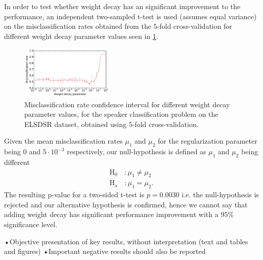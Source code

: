In order to test whether weight decay has an significant improvement to the performance, an independent two-sampled t-test is used (assumes equal variance) on the misclassification rates obtained from the $5$-fold cross-validation for different weight decay parameter values seen in \cref{fig:reg_opt}.

\begin{figure}[H]
  \centering
  \includegraphics[width=0.4\textwidth]{plots/reg_opt_dieleman_speaker_elsdsr}
  \caption{Misclassification rate confidence interval for different weight decay parameter values, for the speaker classification problem on the ELSDSR dataset, obtained using $5$-fold cross-validation.}
  \label{fig:reg_opt}
\end{figure}

Given the mean misclassification rates $\mu_1$ and $\mu_2$ for the regularization parameter being $0$ and $5 \cdot 10^{-3}$ respectively, our null-hypothesis is defined as $\mu_1$ and $\mu_2$ being different
\begin{equation}
\begin{aligned}
\text{H}_\text{0} \, &\text{:} \, \mu_1 \ne \mu_2 \\
\text{H}_\text{a} \, &\text{:} \, \mu_1 = \mu_2.
\end{aligned}
\end{equation}
The resulting p-value for a two-sided t-test is $p = 0.0030$ i.e. the null-hypothesis is rejected and our alternative hypothesis is confirmed, hence we cannot say that adding weight decay has significant performance improvement with a $95\%$ significance level.


•Objective presentation of key results, without interpretation (text and tables
and figures)
•Important negative results should also be reported
